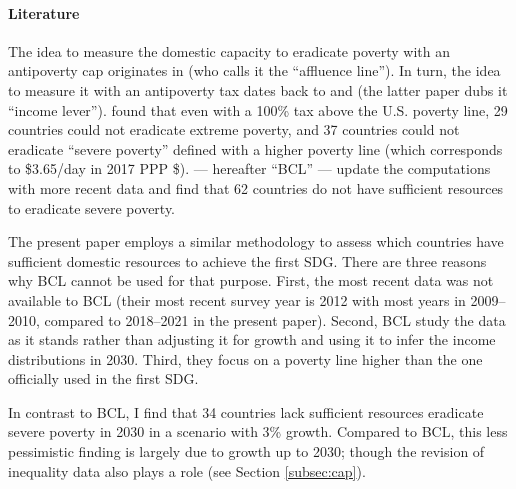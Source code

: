 \paragraph{Literature} 

The idea to measure the domestic capacity to eradicate poverty with an antipoverty cap originates in \cite{medeiros_rich_2006} (who calls it the ``affluence line''). In turn, the idea to measure it with an antipoverty tax dates back to \cite{ravallion_poorer_2010} and \cite{ceriani_income_2014} (the latter paper dubs it ``income lever''). \cite{ravallion_poorer_2010} found that even with a 100\% tax above the U.S. poverty line, 29 countries could not eradicate extreme poverty, and 37 countries could not eradicate ``severe poverty'' defined with a higher poverty line (which corresponds to \$3.65/day in 2017 PPP \$). %
\cite{bolch_arithmetics_2022} --- hereafter ``BCL'' --- update the computations with more recent data and find that 62 countries do not have sufficient resources to eradicate severe poverty. %

The present paper employs a similar methodology to assess which countries have sufficient domestic resources to achieve the first SDG. There are three reasons why BCL cannot be used %
for that purpose. 
First, the most recent data was not available to BCL (their most recent survey year is 2012 with most years in 2009--2010, compared to 2018--2021 in the present paper). %
Second, BCL study the data as it stands rather than adjusting it for growth and using it to infer the income distributions in 2030. Third, they focus on a poverty line higher than the one officially used in the first SDG.

In contrast to BCL, I find that 34 countries lack sufficient resources eradicate severe poverty in 2030 in a scenario with 3\% growth. Compared to BCL, this less pessimistic finding is largely due to growth up to 2030; though the revision of inequality data also plays a role (see Section \ref{subsec:cap}). 

